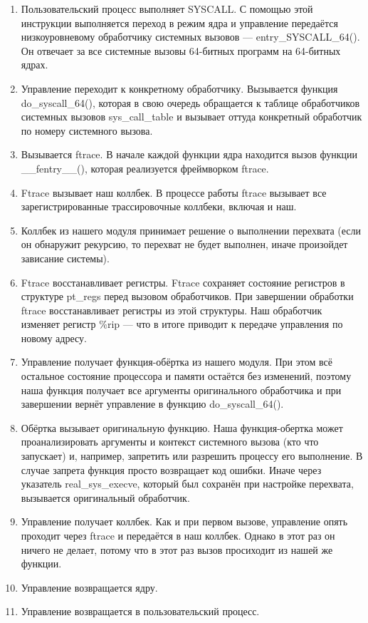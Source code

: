\documentclass[a4paper,14pt]{article}
\begin{document}
\begin{enumerate}
	\item Пользовательский процесс выполняет SYSCALL. С помощью этой инструкции выполняется переход в режим ядра и управление передаётся низкоуровневому обработчику системных вызовов — entry\_SYSCALL\_64(). Он отвечает за все системные вызовы 64-битных программ на 64-битных ядрах.
	\item Управление переходит к конкретному обработчику. Вызывается функция do\_syscall\_64(), которая в свою очередь обращается к таблице обработчиков системных вызовов sys\_call\_table и вызывает оттуда конкретный обработчик по номеру системного вызова.
	\item Вызывается ftrace. В начале каждой функции ядра находится вызов функции \_\_fentry\_\_(), которая реализуется фреймворком ftrace.
	\item Ftrace вызывает наш коллбек. В процессе работы ftrace вызывает все зарегистрированные трассировочные коллбеки, включая и наш.
	\item Коллбек из нашего модуля принимает решение о выполнении перехвата (если он обнаружит рекурсию, то перехват не будет выполнен, иначе произойдет зависание системы).
	\item Ftrace восстанавливает регистры. Ftrace сохраняет состояние регистров в структуре pt\_regs перед вызовом обработчиков. При завершении обработки ftrace восстанавливает регистры из этой структуры. Наш обработчик изменяет регистр \%rip — что в итоге приводит к передаче управления по новому адресу.
	\item Управление получает функция-обёртка из нашего модуля. При этом всё остальное состояние процессора и памяти остаётся без изменений, поэтому наша функция получает все аргументы оригинального обработчика и при завершении вернёт управление в функцию do\_syscall\_64().
	\item Обёртка вызывает оригинальную функцию. Наша функция-обертка может проанализировать аргументы и контекст системного вызова (кто что запускает) и, например, запретить или разрешить процессу его выполнение. В случае запрета функция просто возвращает код ошибки. Иначе через указатель real\_sys\_execve, который был сохранён при настройке перехвата, вызывается оригинальный обработчик.
	\item Управление получает коллбек. Как и при первом вызове, управление опять проходит через ftrace и передаётся в наш коллбек. Однако в этот раз он ничего не делает, потому что в этот раз вызов просиходит из нашей же функции.
	\item Управление возвращается ядру. 
	\item Управление возвращается в пользовательский процесс. 
\end{enumerate}
\end{document}
